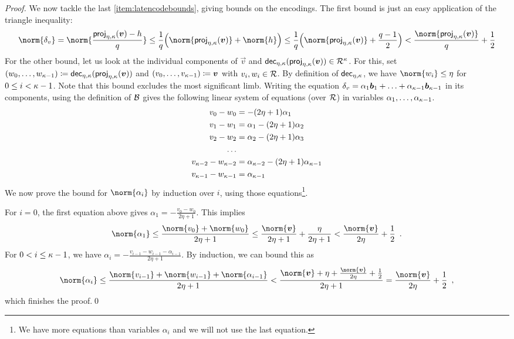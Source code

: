 \begin{proof}
\bigskip\noindent
We now tackle the last \autoref{item:latencodebounds}, giving bounds on the encodings.
The first bound is just an easy application of the triangle inequality:
\[
 \norm{\delta_v} = \norm{ \frac{\projring(\vec{v}) - h}{q}} \leq \frac{1}{q} \Bigl( \norm{\projring(\vec{v})} + \norm{h}\Bigr)
 \leq \frac{1}{q}\Bigl(\norm{\projring(\vec{v})} + \frac{q-1}{2}\Bigr)
 < \frac{\norm{\projring(\vec{v})}}{q} + \frac{1}{2}
\]
For the other bound, let us look at the individual components of $\vec{v}$ and $\mathsf{dec}_{\eta,\kappa}(\mathsf{proj}_{\eta,\kappa}(\boldsymbol{v})) \in\mathcal{R}^\kappa$.
For this, set $(w_0,\ldots, w_{\kappa-1})  \coloneqq \mathsf{dec}_{\eta,\kappa}(\mathsf{proj}_{\eta,\kappa}(\boldsymbol{v}))$ and 
$(v_0,\ldots,v_{\kappa-1}) \coloneqq \boldsymbol{v}$ with $v_i,w_i\in\mathcal{R}$.
By definition of $\mathsf{dec}_{\eta,\kappa}$, we have $\norm{w_i}\leq \eta$ for $0\leq i < \kappa-1$.
Note that this bound excludes the most significant limb.
Writing the equation $\delta_v = \alpha_1\boldsymbol{b}_1 + \ldots + \alpha_{\kappa-1}\boldsymbol{b}_{\kappa-1}$ in its components, using the definition of $\mathcal{B}$ gives the following linear system of equations (over $\mathcal{R}$) in variables $\alpha_1,\ldots,\alpha_{\kappa-1}$.
\begin{align*}
v_0 - w_0 &= -(2\eta+1)\alpha_1\\
v_1 - w_1 &= \alpha_1 - (2\eta+1)\alpha_2\\
v_2 - w_2 &= \alpha_2 - (2\eta+1)\alpha_3\\
\ldots\\
v_{\kappa-2} - w_{\kappa-2} &= \alpha_{\kappa-2} - (2\eta+1)\alpha_{\kappa-1}\\
v_{\kappa-1} - w_{\kappa-1} &= \alpha_{\kappa-1}
\end{align*}
We now prove the bound for $\norm{\alpha_i}$ by induction over $i$, using those equations\footnote{We have more equations than variables $\alpha_i$ and we will not use the last equation.}.

\smallskip\noindent
For $i=0$, the first equation above gives $\alpha_1 = -\frac{v_0-w_0}{2\eta+1}$. This implies
\[
  \norm{\alpha_1} \leq \frac{\norm{v_0} + \norm{w_0}}{2\eta+1} \leq \frac{\norm{\vec{v}}}{2\eta+1} + \frac{\eta}{2\eta+1} < \frac{\norm{\vec{v}}}{2\eta} + \frac12\enspace.
\]
For $0<i\leq \kappa-1$, we have $\alpha_i = -\frac{v_{i-1}-w_{i-1} - \alpha_{i-1}}{2\eta+1}$. By induction, we can bound this as
\[
 \norm{\alpha_i} 
 \leq \frac{ \norm{v_{i-1}} + \norm{w_{i-1}} + \norm{\alpha_{i-1}} } {2\eta+1}
 < \frac{ \norm{\vec{v}} + \eta + \frac{\norm{\vec{v}}}{2\eta} + \frac{1}{2} }{2\eta+1} = \frac{\norm{\vec{v}}}{2\eta} + \frac{1}{2}\enspace,
\]
which finishes the proof.\qed
\end{proof}

